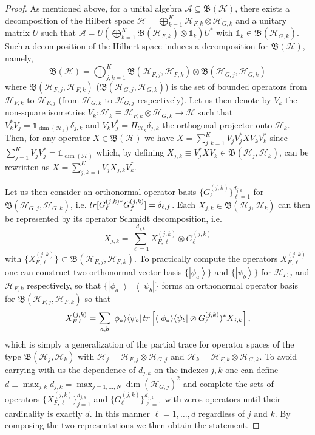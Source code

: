 \documentclass[aihp,12pt]{imsart}
\newcommand{\Hc}{\mathcal{H}}
\newcommand{\As}{\mathscr{A}}
\newcommand{\Bf}{\mathfrak{B}}
\newcommand{\one}{\mathbb{1}}
\newcommand{\tr}{{\rm tr}}
\newcommand{\ket}[1]{\left| #1 \right>}
\newcommand{\ketbra}[2]{\left\vert #1 \middle>\middle< #2 \right\vert}
\theoremstyle{theorem}
\theoremstyle{definition}
\theoremstyle{remark}
\begin{document}
\begin{proof}
As mentioned above, for a unital algebra $\As\subseteq\Bf(\Hc)$, there exists a decomposition of the Hilbert space $\Hc = \bigoplus_{k=1}^K \Hc_{F,k} \otimes \Hc_{G,k}$ and a unitary matrix $U$ such that $\As = U\left(\bigoplus_{k=1}^K \Bf(\Hc_{F,k})\otimes \one_k\right)U^*$ with $\one_k\in\Bf(\Hc_{G,k})$. Such a decomposition of the Hilbert space induces a decomposition for $\Bf(\Hc)$, namely, \[\Bf(\Hc) = \bigoplus_{j,k=1}^K \Bf(\Hc_{F,j},\Hc_{F,k})\otimes\Bf(\Hc_{G,j},\Hc_{G,k}) \]
where $\Bf(\Hc_{F,j},\Hc_{F,k})$ ($\Bf(\Hc_{G,j},\Hc_{G,k})$) is the set of bounded operators from $\Hc_{F,k}$ to $\Hc_{F,j}$ (from $\Hc_{G,k}$ to $\Hc_{G,j}$ respectively).
Let us then denote by $V_k$ the non-square isometries $V_k:\Hc_k\equiv\Hc_{F,k}\otimes\Hc_{G,k}\to \Hc$ such that $V_k^* V_j = \one_{\dim(\Hc_k)} \delta_{j,k}$ and $V_kV_j^* = \Pi_{\Hc_k}\delta_{j,k}$ the orthogonal projector onto $\Hc_k$. Then, for any operator $X\in\Bf(\Hc)$ we have $X = \sum_{j,k=1}^K V_jV_j^* X V_kV_k^*$ since $\sum_{j=1}^K V_jV_j^* = \one_{\dim(\Hc)}$ which, by defining $X_{j,k} \equiv V_j^* X V_k \in\Bf(\Hc_j,\Hc_k)$, can be rewritten as $X = \sum_{j,k=1}^K V_j X_{j,k} V_k^*$. 

Let us then consider an orthonormal operator basis $\{G_{\ell}^{(j,k)}\}_{\ell=1}^{d_{j,k}}$ for $\Bf(\Hc_{G,j},\Hc_{G,k})$, i.e. $\tr[G_\ell^{(j,k)*} G_f^{(j,k)}] = \delta_{\ell,f}$.  
Each $X_{j,k}\in\Bf(\Hc_j,\Hc_k)$ can then be represented by its operator Schmidt decomposition, i.e. \[X_{j,k} = \sum_{\ell=1}^{d_{j,k}} X_{F,\ell}^{(j,k)}\otimes G_{\ell}^{(j,k)}\] with $\{X_{F,\ell}^{(j,k)}\}\subset\Bf(\Hc_{F,j},\Hc_{F,k})$.
To practically compute the operators $X_{F,\ell}^{(j,k)}$ one can construct two orthonormal vector basis $\{\ket{\phi_a}\}$ and $\{\ket{\psi_b}\}$ for $\Hc_{F,j}$ and $\Hc_{F,k}$ respectively, so that $\{\ketbra{\phi_a}{\psi_b}\}$ forms an orthonormal operator basis for $\Bf(\Hc_{F,j}, \Hc_{F,k})$ so that \[X_{F,\ell}^{(j,k)} = \sum_{a,b} \ketbra{\phi_a}{\psi_b} \tr\left[(\ketbra{\phi_a}{\psi_b}\otimes G_\ell^{(j,k)})^* X_{j,k} \right],\] which is simply a generalization of the partial trace for operator spaces of the type $\Bf(\Hc_j,\Hc_k)$ with $\Hc_{j} = \Hc_{F,j}\otimes\Hc_{G,j}$ and $\Hc_k=\Hc_{F,k}\otimes\Hc_{G,k}$. To avoid carrying with us the dependence of $d_{j,k}$ on the indexes $j,k$ one can define $d\equiv \max_{j,k} d_{j,k} = \max_{j=1,\dots,N}\dim(\Hc_{G,j})^2$ and complete the sets of operators $\{X_{F,\ell}^{(j,k)}\}_{j=1}^{d_{j,k}}$ and $\{G_\ell^{(j,k)}\}_{\ell=1}^{d_{j,k}}$ with zeros operators until their cardinality is exactly $d$. In this manner $\ell=1,\dots,d$ regardless of $j$ and $k$.
By composing the two representations we then obtain the statement. 
\end{proof}
\end{document}
